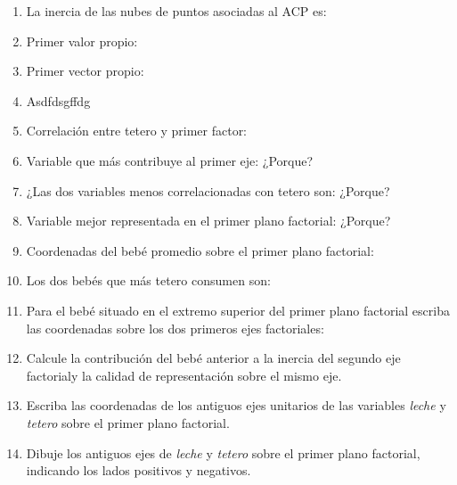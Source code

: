 \documentclass[letterpaper, 12pt]{article}
\begin{document}
\begin{enumerate}[resume]
        
        \item La inercia de las nubes de puntos asociadas al ACP es:
        
        \item Primer valor propio:
        
        \item Primer vector propio:
        
        \item Asdfdsgffdg
        
        \item Correlación entre tetero y primer factor:
        
        \item Variable que más contribuye al primer eje: ¿Porque?
        
        \item ¿Las dos variables menos correlacionadas con tetero son: ¿Porque?
        
        \item Variable mejor representada en el primer plano factorial: ¿Porque?
        
        \item Coordenadas del bebé promedio sobre el primer plano factorial:
        
        \item Los dos bebés que más tetero consumen son:
        
        \item Para el bebé situado en el extremo superior del primer plano 
        factorial escriba las coordenadas sobre los dos primeros ejes factoriales:
        
        \item Calcule la contribución del bebé anterior a la inercia del segundo
        eje factorialy la calidad de representación sobre el mismo eje.
         
        \item Escriba las coordenadas de los antiguos ejes unitarios de las 
        variables \emph{leche} y \emph{tetero} sobre el primer plano factorial.
        
        \item Dibuje los antiguos ejes de \emph{leche} y \emph{tetero} sobre el primer plano 
        factorial, indicando los lados positivos y negativos.
        

\end{enumerate}
\end{document}
